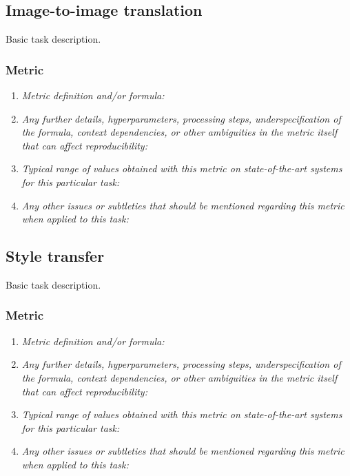 \documentclass[a4paper,11pt]{article}
\begin{document}
\subsection{Image-to-image translation}
    Basic task description.
    \subsubsection{Metric}
        \begin{enumerate}[label=\alph*.]
            \item \textit{Metric definition and/or formula:}
            \bigskip
            \item \textit{Any further details, hyperparameters, processing steps, underspecification of the formula, context dependencies, or other ambiguities in the metric itself that can affect reproducibility:}
            \bigskip
            \item \textit{Typical range of values obtained with this metric on state-of-the-art systems for this particular task:}
            \bigskip
            \item \textit{Any other issues or subtleties that should be mentioned regarding this metric when applied to this task:}
            \bigskip
        \end{enumerate}

\subsection{Style transfer}
    Basic task description.
    \subsubsection{Metric}
        \begin{enumerate}[label=\alph*.]
            \item \textit{Metric definition and/or formula:}
            \bigskip
            \item \textit{Any further details, hyperparameters, processing steps, underspecification of the formula, context dependencies, or other ambiguities in the metric itself that can affect reproducibility:}
            \bigskip
            \item \textit{Typical range of values obtained with this metric on state-of-the-art systems for this particular task:}
            \bigskip
            \item \textit{Any other issues or subtleties that should be mentioned regarding this metric when applied to this task:}
            \bigskip
        \end{enumerate}
\end{document}
